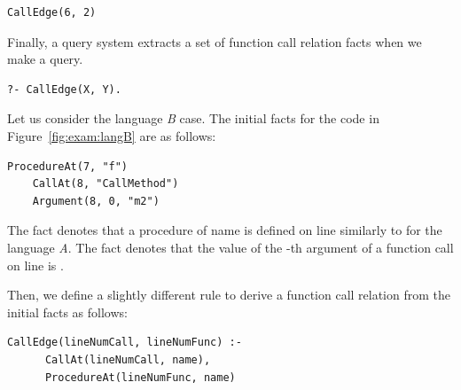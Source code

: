 \begin{lstlisting}[style=mrule]
    CallEdge(6, 2)
\end{lstlisting}

Finally, a query system extracts a set of function call relation facts when we
make a query. 

\begin{lstlisting}[style=mrule]
    ?- CallEdge(X, Y).
\end{lstlisting}
\noindent
{}


Let us consider the language {\it B} case.
The initial facts for the code in Figure~\ref{fig:exam:langB} are as follows: 

\begin{lstlisting}[style=mrule]
    ProcedureAt(7, "f")
    CallAt(8, "CallMethod")
    Argument(8, 0, "m2")
\end{lstlisting}

\noindent
The fact  denotes that a procedure of name
 is defined on line  similarly to
 for the language {\it A}.
The fact  denotes that the value of
the -th argument of a function call on line  is .

Then, we define a slightly different rule to derive a function call relation
from the initial facts as follows: 

\begin{lstlisting}[style=mrule]
    CallEdge(lineNumCall, lineNumFunc) :-
      CallAt(lineNumCall, name),
      ProcedureAt(lineNumFunc, name)
\end{lstlisting}

